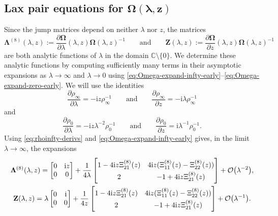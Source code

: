 \documentclass[11pt]{article}
\numberwithin{equation}{section}
\numberwithin{equation}{section}
\newcommand{\ii}{\mathrm{i}}
\begin{document}
 \subsection[Lax pair equations for Omega (lambda,z)]{Lax pair equations for $\boldsymbol{\Omega(\lambda,z)}$}\label{sec:Lax-pair}

Since the jump matrices depend on neither $\lambda$ nor $z$, the matrices
\begin{equation}
 \mathbf{\Lambda}^{(8)}(\lambda,z):=\frac{\partial\mathbf{\Omega}}{\partial\lambda}(\lambda,z)\mathbf{\Omega}(\lambda,z)^{-1}\qquad\text{and}\qquad\mathbf{Z}(\lambda,z):=\frac{\partial\mathbf{\Omega}}{\partial z}(\lambda,z)\mathbf{\Omega}(\lambda,z)^{-1}
 \label{eq:Lambda-Z-def}
\end{equation}
are both analytic functions of $\lambda$ in the domain $\mathbb{C}\setminus\{0\}$.
We determine these analytic functions by computing sufficiently many terms in their asymptotic expansions as $\lambda\to\infty$ and $\lambda\to 0$ using \eqref{eq:Omega-expand-infty-early}--\eqref{eq:Omega-expand-zero-early}.
We will use the identities
\begin{equation}
 \frac{\partial\rho_\infty}{\partial\lambda} = -\ii z\rho_\infty^{-1}\qquad\text{and}\qquad\frac{\partial\rho_\infty}{\partial z} = -\ii\lambda\rho_\infty^{-1}
 \label{eq:rhoinfty-derivs}
\end{equation}
and
\begin{equation}
 \frac{\partial\rho_0}{\partial\lambda}=-\ii z\lambda^{-2}\rho_0^{-1}\qquad\text{and}\qquad\frac{\partial\rho_0}{\partial z} = \ii\lambda^{-1}\rho_0^{-1}.
 \label{eq:rhozero-derivs}
\end{equation}
Using \eqref{eq:rhoinfty-derivs} and \eqref{eq:Omega-expand-infty-early} gives, in the limit $\lambda\to\infty$, the expansions
\begin{gather}
 \mathbf{\Lambda}^{(8)}(\lambda,z)= \begin{bmatrix}0&{\ii z}{} \\0&0\end{bmatrix}
 +\frac{1}{4\lambda}\begin{bmatrix}1-{4\ii z}\Xi_{21}^{(8)}(z) & {4\ii z}{}(\Xi_{11}^{(8)}(z)-\Xi_{22}^{(8)}(z)) \vspace{1mm}\\ 2 &-1 +{4\ii z}\Xi_{21}^{(8)}(z)\end{bmatrix}+\mathcal{O}\big(\lambda^{-2}\big),\\
 \mathbf{Z}(\lambda,z)=
 \lambda\begin{bmatrix}0 & {\ii}{} \\0&0\end{bmatrix}
 +\frac{1}{4z}\begin{bmatrix}
 1-{4\ii z}\Xi_{21}^{(8)}(z) &{4\ii z}{}(\Xi_{11}^{(8)}(z)-\Xi_{22}^{(8)}(z)) \vspace{1mm}\\2 & -1+{4\ii z}\Xi_{21}^{(8)}(z)
 \end{bmatrix}
 +\mathcal{O}\big(\lambda^{-1}\big).
\label{eq:Lax-coefficients-infty}
\end{gather}
\end{document}
